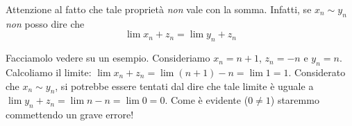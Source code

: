 \begin{remark}
Attenzione al fatto che tale proprietà \emph{non} vale con la somma. Infatti, se $x_n \sim y_n$ \emph{non} posso dire che 
\begin{equation*}
\lim x_n + z_n  = \lim y_n + z_n
\end{equation*}
\end{remark}

Facciamolo vedere su un esempio. Consideriamo $x_n = n + 1$, $z_n = -n$ e $y_n = n$. Calcoliamo il limite: $\lim x_n + z_n = \lim (n + 1) - n = \lim 1 = 1$. Considerato che $x_n \sim y_n$, si potrebbe essere tentati dal dire che tale limite è uguale a $\lim y_n + z_n = \lim n - n = \lim 0 = 0$. Come è evidente ($0 \neq 1$) staremmo commettendo un grave errore!
